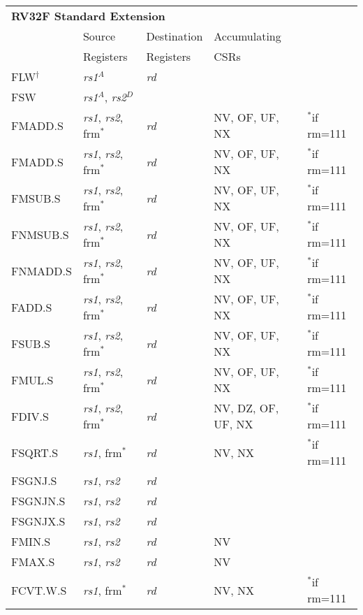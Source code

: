 \begin{tabular}{p{3cm}|p{25mm}|p{3cm}|p{4cm}|p{4cm}}
  \multicolumn{4}{l}{\bf RV32F Standard Extension} \\
  \cline{2-4}
   & Source    & Destination & Accumulating \\
   & Registers & Registers   & CSRs \\
  \cline{2-4}
   FLW$^\dagger$ & {\em rs1}$^A$ & {\em rd} & & \\
   \cline{2-4}
   FSW & {\em rs1}$^A$, {\em rs2}$^D$ &  &   & \\
   \cline{2-4}
   FMADD.S & {\em rs1}, {\em rs2}, frm$^*$ & {\em rd} & NV, OF, UF, NX & $^*$if rm=111 \\
   \cline{2-4}
   FMADD.S & {\em rs1}, {\em rs2}, frm$^*$ & {\em rd} & NV, OF, UF, NX & $^*$if rm=111  \\
   \cline{2-4}
   FMSUB.S & {\em rs1}, {\em rs2}, frm$^*$ & {\em rd} & NV, OF, UF, NX & $^*$if rm=111  \\
   \cline{2-4}
   FNMSUB.S & {\em rs1}, {\em rs2}, frm$^*$ & {\em rd} & NV, OF, UF, NX & $^*$if rm=111  \\
   \cline{2-4}
   FNMADD.S & {\em rs1}, {\em rs2}, frm$^*$ & {\em rd} & NV, OF, UF, NX & $^*$if rm=111  \\
   \cline{2-4}
   FADD.S & {\em rs1}, {\em rs2}, frm$^*$ & {\em rd} & NV, OF, UF, NX & $^*$if rm=111  \\
   \cline{2-4}
   FSUB.S & {\em rs1}, {\em rs2}, frm$^*$ & {\em rd} & NV, OF, UF, NX & $^*$if rm=111  \\
   \cline{2-4}
   FMUL.S & {\em rs1}, {\em rs2}, frm$^*$ & {\em rd} & NV, OF, UF, NX & $^*$if rm=111  \\
   \cline{2-4}
   FDIV.S & {\em rs1}, {\em rs2}, frm$^*$ & {\em rd} & NV, DZ, OF, UF, NX & $^*$if rm=111  \\
   \cline{2-4}
   FSQRT.S & {\em rs1}, frm$^*$ & {\em rd} & NV, NX & $^*$if rm=111  \\
   \cline{2-4}
   FSGNJ.S & {\em rs1}, {\em rs2} & {\em rd} &   & \\
   \cline{2-4}
   FSGNJN.S & {\em rs1}, {\em rs2} & {\em rd} &   & \\
   \cline{2-4}
   FSGNJX.S & {\em rs1}, {\em rs2} & {\em rd} &   & \\
   \cline{2-4}
   FMIN.S & {\em rs1}, {\em rs2} & {\em rd} & NV &   \\
   \cline{2-4}
   FMAX.S & {\em rs1}, {\em rs2} & {\em rd} & NV &   \\
   \cline{2-4}
   FCVT.W.S & {\em rs1}, frm$^*$ & {\em rd} & NV, NX & $^*$if rm=111  \\

\end{tabular}
